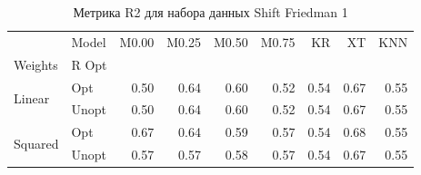 \begin{table}
\caption{Метрика R2 для набора данных Shift Friedman 1}
\label{tab:R2_Shift Friedman 1}
\begin{tabular}{llrrrrrrr}
\toprule
 & Model & M0.00 & M0.25 & M0.50 & M0.75 & KR & XT & KNN \\
Weights & R Opt &  &  &  &  &  &  &  \\
\midrule
\multirow[t]{2}{*}{Linear} & Opt & 0.50 & 0.64 & 0.60 & 0.52 & 0.54 & 0.67 & 0.55 \\
 & Unopt & 0.50 & 0.64 & 0.60 & 0.52 & 0.54 & 0.67 & 0.55 \\

\multirow[t]{2}{*}{Squared} & Opt & 0.67 & 0.64 & 0.59 & 0.57 & 0.54 & 0.68 & 0.55 \\
 & Unopt & 0.57 & 0.57 & 0.58 & 0.57 & 0.54 & 0.67 & 0.55 \\

\bottomrule
\end{tabular}
\end{table}
